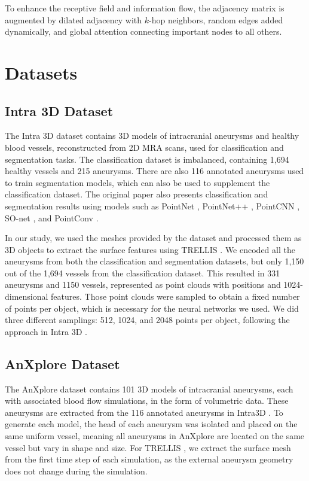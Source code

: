 \documentclass[%
 reprint,
 amsmath,amssymb,
 aps,
 floatfix,
 nofootinbib,
]{revtex4-2}
\begin{document}
To enhance the receptive field and information flow, the adjacency matrix is augmented by dilated adjacency with \( k \)-hop neighbors, random edges added dynamically, and global attention connecting important nodes to all others.


\section{Datasets} \label{DATASET}

\subsection{Intra 3D Dataset} \label{INTRA3D}

The Intra 3D dataset \citep{yang2020intra} contains 3D models of intracranial aneurysms and healthy blood vessels, reconstructed from 2D MRA scans, used for classification and segmentation tasks. The classification dataset is imbalanced, containing 1,694 healthy vessels and 215 aneurysms. There are also 116 annotated aneurysms used to train segmentation models, which can also be used to supplement the classification dataset. The original paper also presents classification and segmentation results using models such as PointNet \citep{pointnet}, PointNet++ \citep{pointnetpp}, PointCNN \citep{pointcnn}, SO-net \citep{sonet}, and PointConv \citep{pointconv}.

In our study, we used the meshes provided by the dataset and processed them as 3D objects to extract the surface features using TRELLIS \citep{xiang2024structured}. We encoded all the aneurysms from both the classification and segmentation datasets, but only 1,150 out of the 1,694 vessels from the classification dataset. This resulted in 331 aneurysms and 1150 vessels, represented as point clouds with positions and 1024-dimensional features. Those point clouds were sampled to obtain a fixed number of points per object, which is necessary for the neural networks we used. We did three different samplings: 512, 1024, and 2048 points per object, following the approach in Intra 3D \citep{yang2020intra}. 

\subsection{AnXplore Dataset} \label{ANXPLORE}

The AnXplore dataset \citep{anxplore} contains 101 3D models of intracranial aneurysms, each with associated blood flow simulations, in the form of volumetric data. These aneurysms are extracted from the 116 annotated aneurysms in Intra3D \citep{yang2020intra}. To generate each model, the head of each aneurysm was isolated and placed on the same uniform vessel, meaning all aneurysms in AnXplore \citep{anxplore} are located on the same vessel but vary in shape and size. For TRELLIS \citep{xiang2024structured}, we extract the surface mesh from the first time step of each simulation, as the external aneurysm geometry does not change during the simulation.
\end{document}
